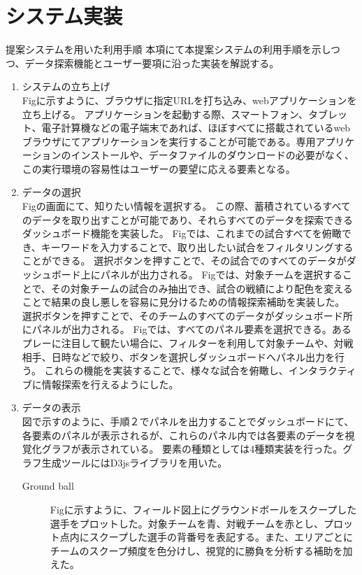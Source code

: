\documentclass[sotsuron]{kuee}
\begin{document}
\section{システム実装}
提案システムを用いた利用手順
本項にて本提案システムの利用手順を示しつつ、データ探索機能とユーザー要項に沿った実装を解説する。
\begin{enumerate}
	\item システムの立ち上げ
		\\Figに示すように、ブラウザに指定URLを打ち込み、webアプリケーションを立ち上げる。
		アプリケーションを起動する際、スマートフォン、タブレット、電子計算機などの電子端末であれば、ほぼすべてに搭載されているwebブラウザにてアプリケーションを実行することが可能である。専用アプリケーションのインストールや、データファイルのダウンロードの必要がなく、この実行環境の容易性はユーザーの要望に応える要素となる。
	\item データの選択
		\\Figの画面にて、知りたい情報を選択する。
		この際、蓄積されているすべてのデータを取り出すことが可能であり、それらすべてのデータを探索できるダッシュボード機能を実装した。
		Figでは、これまでの試合すべてを俯瞰でき、キーワードを入力することで、取り出したい試合をフィルタリングすることができる。
		選択ボタンを押すことで、その試合でのすべてのデータがダッシュボード上にパネルが出力される。
		Figでは、対象チームを選択することで、その対象チームの試合のみ抽出でき、試合の戦績により配色を変えることで結果の良し悪しを容易に見分けるための情報探索補助を実装した。
		選択ボタンを押すことで、そのチームのすべてのデータがダッシュボード所にパネルが出力される。
		Figでは、すべてのパネル要素を選択できる。あるプレーに注目して観たい場合に、フィルターを利用して対象チームや、対戦相手、日時などで絞り、ボタンを選択しダッシュボードへパネル出力を行う。
		これらの機能を実装することで、様々な試合を俯瞰し、インタラクティブに情報探索を行えるようにした。
	\item データの表示
		\\図で示すのように、手順２でパネルを出力することでダッシュボードにて、各要素のパネルが表示されるが、これらのパネル内では各要素のデータを視覚化グラフが表示されている。
		要素の種類としては4種類実装を行った。グラフ生成ツールにはD3jsライブラリを用いた。
		\begin{description}
			\item [Ground ball]
			Figに示すように、フィールド図上にグラウンドボールをスクープした選手をプロットした。対象チームを青、対戦チームを赤とし、プロット点内にスクープした選手の背番号を表記する。また、エリアごとにチームのスクープ頻度を色分けし、視覚的に勝負を分析する補助を加えた。

\end{description}
\end{enumerate}
\end{document}
